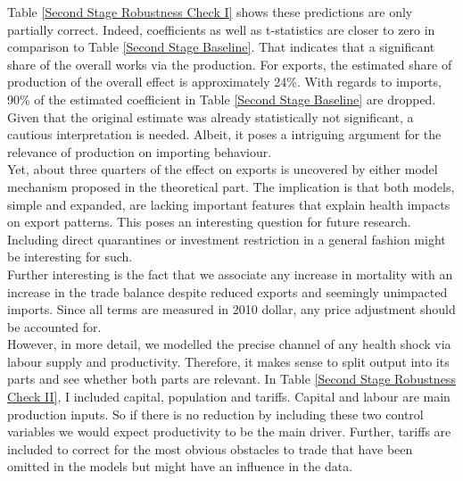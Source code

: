 \documentclass{article}
\begin{document}
Table \ref{Second Stage Robustness Check I} shows these predictions are only partially correct. Indeed, coefficients as well as t-statistics are closer to zero in comparison to Table \ref{Second Stage Baseline}. That indicates that a significant share of the overall works via the production. For exports, the estimated share of production of the overall effect is approximately 24\%. With regards to imports, 90\% of the estimated coefficient in Table \ref{Second Stage Baseline} are dropped. Given that the original estimate was already statistically not significant, a cautious interpretation is needed. Albeit, it poses a intriguing argument for the relevance of production on importing behaviour. \\
Yet, about three quarters of the effect on exports is uncovered by either model mechanism proposed in the theoretical part. The implication is that both models, simple and expanded, are lacking important features that explain health impacts on export patterns. This poses an interesting question for future research. Including direct quarantines or investment restriction in a general fashion might be interesting for such. \\
Further interesting is the fact that we associate any increase in mortality with an increase in the trade balance despite reduced exports and seemingly unimpacted imports. Since all terms are measured in 2010 dollar, any price adjustment should be accounted for. \\
However, in more detail, we modelled the precise channel of any health shock via labour supply and productivity. Therefore, it makes sense to split output into its parts and see whether both parts are relevant. In Table \ref{Second Stage Robustness Check II}, I included capital, population and tariffs. Capital and labour are main production inputs. So if there is no reduction by including these two control variables we would expect productivity to be the main driver. Further, tariffs are included to correct for the most obvious obstacles to trade that have been omitted in the models but might have an influence in the data.
\end{document}
